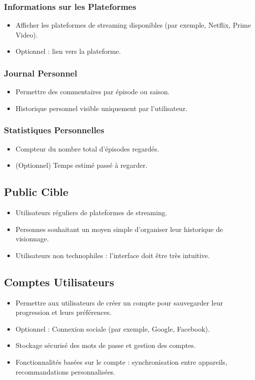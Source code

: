 \subsubsection{Informations sur les Plateformes}
\begin{itemize}
    \item Afficher les plateformes de streaming disponibles (par exemple, Netflix, Prime Video).
    \item Optionnel : lien vers la plateforme.
\end{itemize}

\subsubsection{Journal Personnel}
\begin{itemize}
    \item Permettre des commentaires par épisode ou saison.
    \item Historique personnel visible uniquement par l'utilisateur.
\end{itemize}

\subsubsection{Statistiques Personnelles}
\begin{itemize}
    \item Compteur du nombre total d'épisodes regardés.
    \item (Optionnel) Temps estimé passé à regarder.
\end{itemize}

\subsection{Public Cible}
\begin{itemize}
    \item Utilisateurs réguliers de plateformes de streaming.
    \item Personnes souhaitant un moyen simple d'organiser leur historique de visionnage.
    \item Utilisateurs non technophiles : l'interface doit être très intuitive.
\end{itemize}

\subsection{Comptes Utilisateurs}
\begin{itemize}
    \item Permettre aux utilisateurs de créer un compte pour sauvegarder leur progression et leurs préférences.
    \item Optionnel : Connexion sociale (par exemple, Google, Facebook).
    \item Stockage sécurisé des mots de passe et gestion des comptes.
    \item Fonctionnalités basées sur le compte : synchronisation entre appareils, recommandations personnalisées.
\end{itemize}

